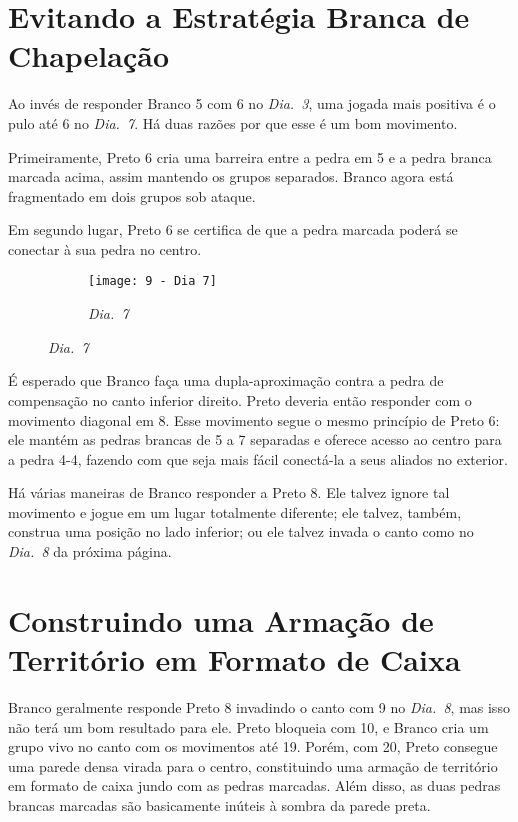 \pagebreak

\section{Evitando a Estratégia Branca de Chapelação}

Ao invés de responder Branco 5 com 6 no \emph{Dia.\@~3}, uma jogada mais positiva é o pulo até 6 no \emph{Dia.\@~7}. Há duas razões por que esse é um bom movimento.

Primeiramente, Preto 6 cria uma barreira entre a pedra em 5 e a pedra branca marcada acima, assim mantendo os grupos separados. Branco agora está fragmentado em dois grupos sob ataque.

Em segundo lugar, Preto 6 se certifica de que a pedra marcada poderá se conectar à sua pedra no centro.

\begin{figure}[h!]
    \centering
    \begin{subfigure}[t]{.45\textwidth}
        \texttt{[image: 9 - Dia 7]}
        \caption*{\emph{Dia.\@~7}}
    \end{subfigure}
\end{figure}

É esperado que Branco faça uma dupla-aproximação contra a pedra de compensação no canto inferior direito. Preto deveria então responder com o movimento diagonal em 8. Esse movimento segue o mesmo princípio de Preto 6: ele mantém as pedras brancas de 5 a 7 separadas e oferece acesso ao centro para a pedra 4-4, fazendo com que seja mais fácil conectá-la a seus aliados no exterior.

Há várias maneiras de Branco responder a Preto 8. Ele talvez ignore tal movimento e jogue em um lugar totalmente diferente; ele talvez, também, construa uma posição no lado inferior; ou ele talvez invada o canto como no \emph{Dia.\@~8} da próxima página.

\pagebreak

\section{Construindo uma Armação de Território em Formato de Caixa}

Branco geralmente responde Preto 8 invadindo o canto com 9 no \emph{Dia.\@~8}, mas isso não terá um bom resultado para ele. Preto bloqueia com 10, e Branco cria um grupo vivo no canto com os movimentos até 19. Porém, com 20, Preto consegue uma parede densa virada para o centro, constituindo uma armação de território em formato de caixa jundo com as pedras marcadas. Além disso, as duas pedras brancas marcadas são basicamente inúteis à sombra da parede preta.

